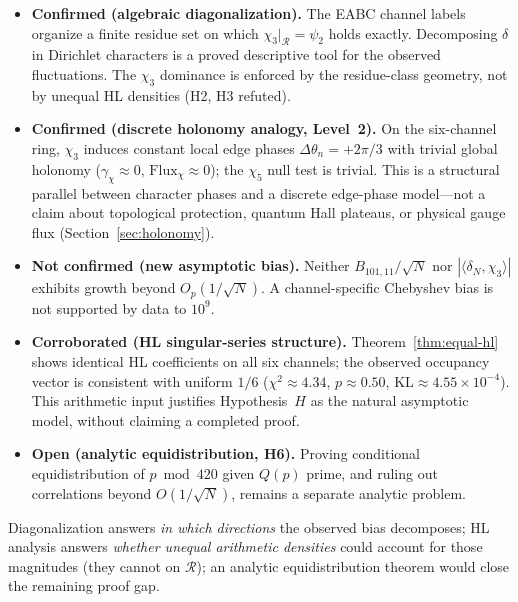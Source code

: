 \documentclass[11pt,a4paper]{article}
\newcommand{\R}{\mathcal{R}}
\begin{document}
\begin{itemize}
  \item \textbf{Confirmed (algebraic diagonalization).}
        The EABC channel labels organize a finite residue set on which
        $\chi_3|_{\R}=\psi_2$ holds exactly.
        Decomposing $\delta$ in Dirichlet characters is a proved descriptive
        tool for the observed fluctuations.
        The $\chi_3$ dominance is enforced by the residue-class geometry,
        not by unequal HL densities (H2, H3 refuted).

  \item \textbf{Confirmed (discrete holonomy analogy, Level~2).}
        On the six-channel ring, $\chi_3$ induces constant local edge phases
        $\Delta\theta_n=+2\pi/3$ with trivial global holonomy
        ($\gamma_\chi\approx 0$, $\mathrm{Flux}_\chi\approx 0$);
        the $\chi_5$ null test is trivial.
        This is a structural parallel between character phases and a discrete
        edge-phase model---not a claim about topological protection,
        quantum Hall plateaus, or physical gauge flux
        (Section~\ref{sec:holonomy}).

  \item \textbf{Not confirmed (new asymptotic bias).}
        Neither $B_{101,11}/\sqrt{N}$ nor $|\langle\delta_N,\chi_3\rangle|$
        exhibits growth beyond $O_p(1/\sqrt{N})$.
        A channel-specific Chebyshev bias is not supported by data to $10^9$.

  \item \textbf{Corroborated (HL singular-series structure).}
        Theorem~\ref{thm:equal-hl} shows identical HL coefficients on all
        six channels; the observed occupancy vector is consistent with
        uniform $1/6$ ($\chi^2\approx 4.34$, $p\approx 0.50$,
        $\mathrm{KL}\approx 4.55\times 10^{-4}$).
        This arithmetic input justifies Hypothesis~$H$ as the natural
        asymptotic model, without claiming a completed proof.

  \item \textbf{Open (analytic equidistribution, H6).}
        Proving conditional equidistribution of $p\bmod 420$ given
        $Q(p)$ prime, and ruling out correlations beyond $O(1/\sqrt{N})$,
        remains a separate analytic problem.
\end{itemize}

Diagonalization answers \emph{in which directions} the observed bias
decomposes; HL analysis answers \emph{whether unequal arithmetic densities}
could account for those magnitudes (they cannot on $\R$); an analytic
equidistribution theorem would close the remaining proof gap.
\end{document}
